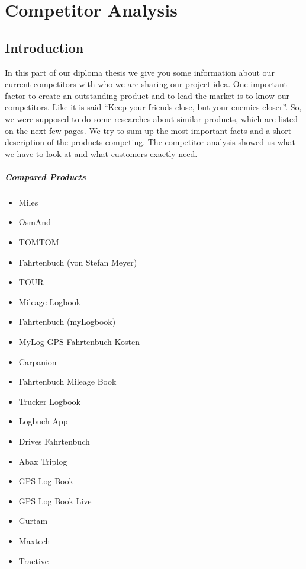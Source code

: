 \chapter{Competitor Analysis}
\section{Introduction}
In this part of our diploma thesis we give you some information about our current competitors with who we are sharing our project idea.
\newline \newline
One important factor to create an outstanding product and to lead the market is to know our competitors. Like it is said “Keep your friends close, but your enemies closer”. So,  we were supposed to do some researches about similar products, which are listed on the next few pages. We try to sum up the most important facts and a short description of the products competing. 
\newline \newline
The competitor analysis showed us what we have to look at and what customers exactly need. 
\paragraph{Compared Products}
\begin{itemize}
\item Miles
\item OsmAnd
\item TOMTOM
\item Fahrtenbuch (von Stefan Meyer)
\item TOUR
\item Mileage Logbook
\item Fahrtenbuch (myLogbook)
\item MyLog GPS Fahrtenbuch Kosten
\item Carpanion
\item Fahrtenbuch Mileage Book
\item Trucker Logbook
\item Logbuch App
\item Drives Fahrtenbuch
\item Abax Triplog
\item GPS Log Book
\item GPS Log Book Live
\item Gurtam
\item Maxtech
\item Tractive
\end{itemize}
\newpage
